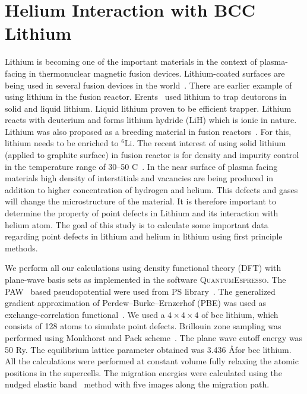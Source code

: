 \chapter{Helium Interaction with BCC Lithium}
Lithium is becoming one of the important materials in the context of plasma-facing in thermonuclear magnetic fusion devices. Lithium-coated surfaces are being used in several fusion devices in the world~\cite{bell2009plasma, mirnov2003li, sanchez2009impact, tuccillo2009overview, xu2011study, munaretto2012rfx}. There are earlier example of using lithium in the fusion reactor. Erents \etal~\cite{erents1971trapping}\@ used lithium to trap deutorons in solid and liquid lithium. Liquid lithium proven to be efficient trapper. Lithium reacts with deuterium and forms lithium hydride (LiH) which is ionic in nature. Lithium was also proposed as a breeding material in fusion reactors~\cite{hartley1978potential}. For this, lithium needs to be enriched to $^6$Li. The recent interest of using solid lithium (applied to graphite surface) in fusion reactor is for density and impurity control in the temperature range of 30--50 \textdegree C~\cite{allain2012lithium}.  In the near surface of plasma facing materials high density of interstitials and vacancies are being produced in addition to higher concentration of hydrogen and helium. This defects and gases will change the microstructure of the material. It is therefore important to determine the property of point defects in Lithium and its interaction with helium atom. The goal of this study is to calculate some important data regarding point defects in lithium and helium in lithium using first principle methods.

We perform all our calculations using density functional theory (DFT) with plane-wave basis sets as implemented in the software \textsc{QuantumEspresso}\cite{giannozzi2009quantum}. The PAW~\cite{blochl1994projector} based pseudopotential were used from PS library~\cite{dal2014pseudopotentials,pp1}. The generalized gradient approximation of Perdew--Burke--Ernzerhof (PBE) was used as exchange-correlation functional~\cite{Perdew1996b, Perdew1997}. We used a $4\times4\times4$ of bcc lithium, which consists of 128 atoms to simulate point defects. Brillouin zone sampling was performed using Monkhorst and Pack scheme~\cite{pack1977special}. The plane wave cutoff energy was 50 Ry. The equilibrium lattice parameter obtained was 3.436 \AA\@ for bcc lithium. All the calculations were performed at constant volume fully relaxing the atomic positions in the supercells. The migration energies were calculated using the nudged elastic band~\cite{henkelman2000climbing, henkelman2000improved} method with five images along the migration path.


